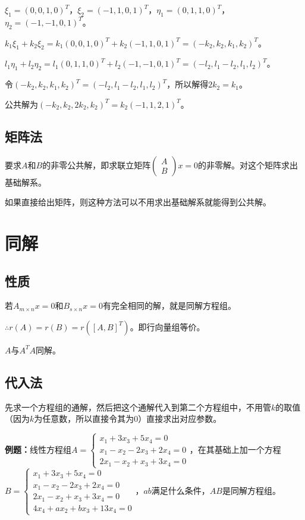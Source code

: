 $\xi_1=(0,0,1,0)^T$，$\xi_2=(-1,1,0,1)^T$，$\eta_1=(0,1,1,0)^T$，$\eta_2=(-1,-1,0,1)^T$。

$k_1\xi_1+k_2\xi_2=k_1(0,0,1,0)^T+k_2(-1,1,0,1)^T=(-k_2,k_2,k_1,k_2)^T$。

$l_1\eta_1+l_2\eta_2=l_1(0,1,1,0)^T+l_2(-1,-1,0,1)^T=(-l_2,l_1-l_2,l_1,l_2)^T$。

令$(-k_2,k_2,k_1,k_2)^T=(-l_2,l_1-l_2,l_1,l_2)^T$，所以解得$2k_2=k_1$。

公共解为$(-k_2,k_2,2k_2,k_2)^T=k_2(-1,1,2,1)^T$。

\subsection{矩阵法}

要求$A$和$B$的非零公共解，即求联立矩阵$\left(\begin{array}{c}
    A \\
    B
\end{array}\right)x=0$的非零解。对这个矩阵求出基础解系。

如果直接给出矩阵，则这种方法可以不用求出基础解系就能得到公共解。

\section{同解}

\subsection{性质}

若$A_{m\times n}x=0$和$B_{s\times n}x=0$有完全相同的解，就是同解方程组。

$\therefore r(A)=r(B)=r([A,B]^T)$。即行向量组等价。

$A$与$A^TA$同解。

\subsection{代入法}

先求一个方程组的通解，然后把这个通解代入到第二个方程组中，不用管$k$的取值（因为$k$为任意数，所以直接令其为0）直接求出对应参数。

\textbf{例题：}线性方程组$A=\left\{\begin{array}{l}
    x_1+3x_3+5x_4=0 \\
    x_1-x_2-2x_3+2x_4=0 \\
    2x_1-x_2+x_3+3x_4=0
\end{array}\right.$，在其基础上加一个方程$B=\left\{\begin{array}{l}
    x_1+3x_3+5x_4=0 \\
    x_1-x_2-2x_3+2x_4=0 \\
    2x_1-x_2+x_3+3x_4=0 \\
    4x_4+ax_2+bx_3+13x_4=0
\end{array}\right.$，$ab$满足什么条件，$AB$是同解方程组。

